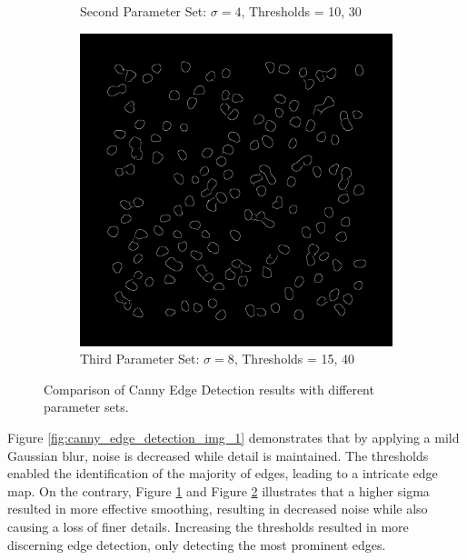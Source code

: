 \documentclass[%
	a4paper, %
	12pt, %
	english, %
	bibtotoc %
]{scrartcl}
\begin{document}
\begin{figure}[H]
\begin{subfigure}[b]{0.3\textwidth}
        \caption{Second Parameter Set: \(\sigma = 4\), Thresholds = 10, 30}
        \label{fig:canny_edge_detection_img_2}
    \end{subfigure}
     \hspace{1cm} %
    \begin{subfigure}[b]{0.3\textwidth}
        \centering
        \includegraphics[width=\textwidth]{canny_edge_detection_3.png}
        \caption{Third Parameter Set: \(\sigma = 8\), Thresholds = 15, 40}
        \label{fig:canny_edge_detection_img_3}
    \end{subfigure}
    \caption{Comparison of Canny Edge Detection results with different parameter sets.}
    \label{fig:comparison_of_canny_imgs}
\end{figure}

Figure \ref{fig:canny_edge_detection_img_1} demonstrates that by applying a mild Gaussian blur, noise is decreased while detail is maintained. The thresholds enabled the identification of the majority of edges, leading to a intricate edge map. On the contrary, Figure \ref{fig:canny_edge_detection_img_2} and Figure \ref{fig:canny_edge_detection_img_3} illustrates that a higher sigma resulted in more effective smoothing, resulting in decreased noise while also causing a loss of finer details. Increasing the thresholds resulted in more discerning edge detection, only detecting the most prominent edges.
\end{document}
